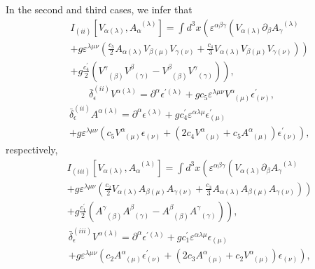 \documentclass[a4paper,11pt]{article}
\begin{document}
In the second and third cases, we infer that
\begin{eqnarray}
&&I_{(ii)}\left[ V_{\alpha (\lambda )},A_{\alpha }^{\;\;(\lambda )}\right]
=\int d^{3}x\left( \varepsilon ^{\alpha \beta \gamma }\left( V_{\alpha
(\lambda )}\partial _{\beta }A_{\gamma }^{\;\;(\lambda )}\right. \right.
\nonumber \\
&&\left. +g\varepsilon ^{\lambda \mu \nu }\left( \frac{c_{5}}{2}A_{\alpha
(\lambda )}V_{\beta (\mu )}V_{\gamma (\nu )}+\frac{c_{4}}{3}V_{\alpha
(\lambda )}V_{\beta (\mu )}V_{\gamma (\nu )}\right) \right)  \nonumber \\
&&\left. +g\frac{c_{4}^{\prime }}{2}\left( V_{\;\;(\beta )}^{\gamma
}V_{\;\;(\gamma )}^{\beta }-V_{\;\;(\beta )}^{\beta }V_{\;\;(\gamma
)}^{\gamma }\right) \right) ,  \label{bf98}
\end{eqnarray}
\begin{equation}
\bar{\delta}_{\epsilon }^{(ii)}V^{\alpha (\lambda )}=\partial ^{\alpha
}\epsilon ^{\prime (\lambda )}+gc_{5}\varepsilon ^{\lambda \mu \nu
}V_{\;\;(\mu )}^{\alpha }\epsilon _{(\nu )}^{\prime },  \label{bf99}
\end{equation}
\begin{eqnarray}
&&\bar{\delta}_{\epsilon }^{(ii)}A^{\alpha (\lambda )}=\partial ^{\alpha
}\epsilon ^{(\lambda )}+gc_{4}^{\prime }\varepsilon ^{\alpha \lambda \mu
}\epsilon _{(\mu )}^{\prime }  \nonumber \\
&&+g\varepsilon ^{\lambda \mu \nu }\left( c_{5}V_{\;\;(\mu )}^{\alpha
}\epsilon _{(\nu )}+\left( 2c_{4}V_{\;\;(\mu )}^{\alpha }+c_{5}A_{\;\;(\mu
)}^{\alpha }\right) \epsilon _{(\nu )}^{\prime }\right) ,  \label{bf100}
\end{eqnarray}
respectively,
\begin{eqnarray}
&&I_{(iii)}\left[ V_{\alpha (\lambda )},A_{\alpha }^{\;\;(\lambda )}\right]
=\int d^{3}x\left( \varepsilon ^{\alpha \beta \gamma }\left( V_{\alpha
(\lambda )}\partial _{\beta }A_{\gamma }^{\;\;(\lambda )}\right. \right.
\nonumber \\
&&\left. +g\varepsilon ^{\lambda \mu \nu }\left( \frac{c_{2}}{2}V_{\alpha
(\lambda )}A_{\beta (\mu )}A_{\gamma (\nu )}+\frac{c_{3}}{3}A_{\alpha
(\lambda )}A_{\beta (\mu )}A_{\gamma (\nu )}\right) \right)  \nonumber \\
&&\left. +g\frac{c_{1}^{\prime }}{2}\left( A_{\;\;(\beta )}^{\gamma
}A_{\;\;(\gamma )}^{\beta }-A_{\;\;(\beta )}^{\beta }A_{\;\;(\gamma
)}^{\gamma }\right) \right) ,  \label{bf101}
\end{eqnarray}
\begin{eqnarray}
&&\bar{\delta}_{\epsilon }^{(iii)}V^{\alpha (\lambda )}=\partial ^{\alpha
}\epsilon ^{\prime (\lambda )}+gc_{1}^{\prime }\varepsilon ^{\alpha \lambda
\mu }\epsilon _{(\mu )}  \nonumber \\
&&+g\varepsilon ^{\lambda \mu \nu }\left( c_{2}A_{\;\;(\mu )}^{\alpha
}\epsilon _{(\nu )}^{\prime }+\left( 2c_{3}A_{\;\;(\mu )}^{\alpha
}+c_{2}V_{\;\;(\mu )}^{\alpha }\right) \epsilon _{(\nu )}\right) ,
\label{bf102}
\end{eqnarray}
\end{document}
